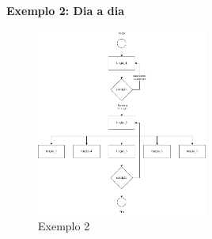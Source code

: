 \documentclass{report}
\begin{document}
    \textbf{Exemplo 2: Dia a dia}
    \begin{figure}[H]
        \centering
        \includegraphics[width=0.5\textwidth]{img/software.drawio.png}
        \caption{Exemplo 2}
        \label{fig:Exemplo 2}
    \end{figure}
\chapter{}
\end{document}
